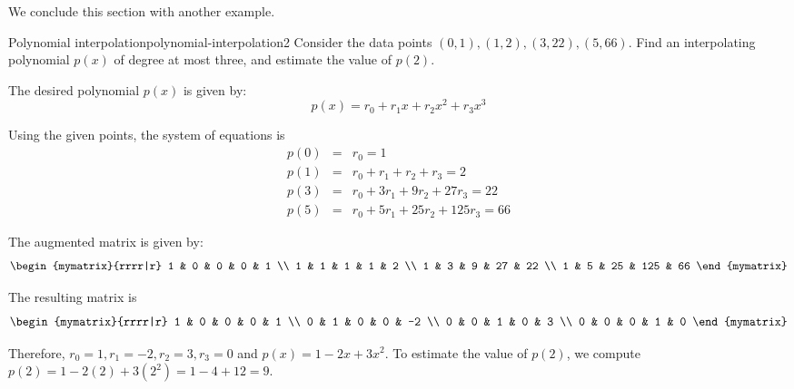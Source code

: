 We conclude this section with another example. 

\begin{example}{Polynomial interpolation}{polynomial-interpolation2}
Consider the data points $(0,1), (1,2), (3,22), (5,66)$. Find an interpolating polynomial $p(x)$ of degree at most three, and estimate the value of $p(2)$. 
\end{example}

\begin{solution}
The desired polynomial $p(x)$ is given by:
\[
p(x) = r_0 + r_1 x + r_2x^2 + r_3x^3
\]

Using the given points, the system of equations is
\begin{eqnarray*}
p(0) &=& r_0 = 1 \\
p(1) &=& r_0 + r_1 + r_2 + r_3 = 2 \\
p(3) &=& r_0 + 3r_1 + 9r_2 + 27r_3 = 22 \\
p(5) &=& r_0 + 5r_1 + 25r_2 + 125r_3 = 66
\end{eqnarray*}

The augmented matrix is given by:
\[
\begin{mymatrix}{rrrr|r}
1 & 0 & 0 & 0 & 1 \\
1 & 1 & 1 & 1 & 2 \\
1 & 3 & 9 & 27 & 22 \\
1 & 5 & 25 & 125 & 66
\end{mymatrix}
\]

The resulting matrix is 
\[
\begin{mymatrix}{rrrr|r}
1 & 0 & 0 & 0 & 1 \\
0 & 1 & 0 & 0 & -2 \\
0 & 0 & 1 & 0 & 3 \\
0 & 0 & 0 & 1 & 0
\end{mymatrix}
\]

Therefore, $r_0 = 1, r_1 = -2, r_2 = 3, r_3 = 0$ and $p(x) = 1 -2x + 3x^2$. To estimate the value of $p(2)$, we compute $p(2) = 1 -2(2) + 3(2^2) = 1 - 4 + 12 = 9$.
\end{solution}